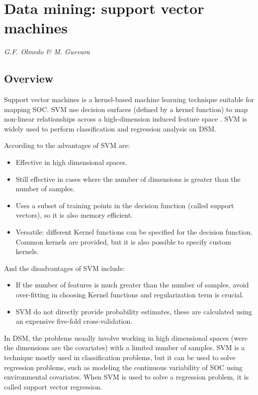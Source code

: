 \documentclass[10pt,b5paper,]{book}
\providecommand{\tightlist}{%
  \setlength{\itemsep}{0pt}\setlength{\parskip}{0pt}}
\theoremstyle{definition}
\theoremstyle{definition}
\theoremstyle{definition}
\theoremstyle{remark}
\begin{document}
\hypertarget{svm}{%
\section{Data mining: support vector machines}\label{svm}}

\emph{G.F. Olmedo \& M. Guevara}

\hypertarget{overview-3}{%
\subsection{Overview}\label{overview-3}}

Support vector machines is a kernel-based machine learning technique
suitable for mapping SOC. SVM use decision surfaces (defined by a kernel
function) to map non-linear relationships across a high-dimension
induced feature space \citep{cortes1995support}. SVM is widely used to
perform classification and regression analysis on DSM.

According to \citet{scikit} the advantages of SVM are:

\begin{itemize}
\tightlist
\item
  Effective in high dimensional spaces.
\item
  Still effective in cases where the number of dimensions is greater
  than the number of samples.
\item
  Uses a subset of training points in the decision function (called
  support vectors), so it is also memory efficient.
\item
  Versatile: different Kernel functions can be specified for the
  decision function. Common kernels are provided, but it is also
  possible to specify custom kernels.
\end{itemize}

And the disadvantages of SVM include:

\begin{itemize}
\tightlist
\item
  If the number of features is much greater than the number of samples,
  avoid over-fitting in choosing Kernel functions and regularization
  term is crucial.
\item
  SVM do not directly provide probability estimates, these are
  calculated using an expensive five-fold cross-validation.
\end{itemize}

In DSM, the problems usually involve working in high dimensional spaces
(were the dimensions are the covariates) with a limited number of
samples. SVM is a technique mostly used in classification problems, but
it can be used to solve regression problems, such as modeling the
continuous variability of SOC using environmental covariates. When SVM
is used to solve a regression problem, it is called support vector
regression.
\end{document}
